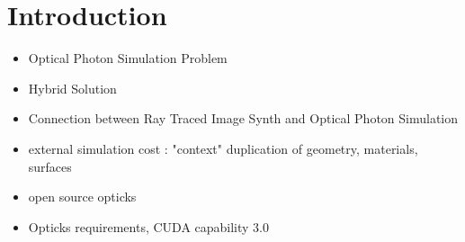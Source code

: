 \documentclass[a4paper]{jpconf}
\begin{document}
%
%
%
%
%
%
%
%
%
%
  

\section{Introduction}

\begin{itemize}
\item Optical Photon Simulation Problem
\item Hybrid Solution
\item Connection between Ray Traced Image Synth and Optical Photon Simulation
\item external simulation cost : "context" duplication of geometry, materials, surfaces
\item open source opticks\cite{opticksURL} \cite{newton}
\item Opticks requirements, CUDA capability 3.0
\end{itemize}
\end{document}
